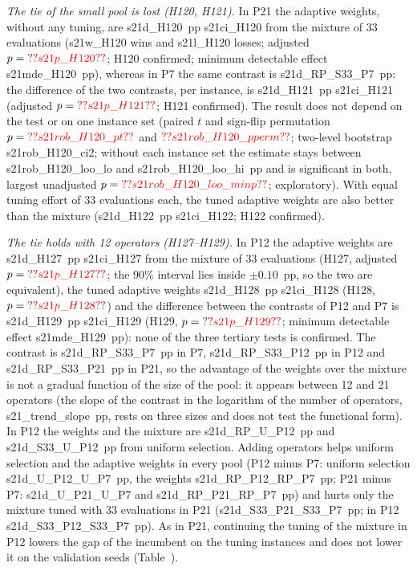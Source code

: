 \emph{The tie of the small pool is lost (H120, H121).} In P21 the adaptive weights, without any tuning, are \num{s21d_H120}~pp \num{s21ci_H120} from the mixture of 33 evaluations (\num{s21w_H120} wins and \num{s21l_H120} losses; adjusted $p=\num{s21p_H120}$; H120 confirmed; minimum detectable effect \num{s21mde_H120}~pp), whereas in P7 the same contrast is \num{s21d_RP_S33_P7}~pp: the difference of the two contrasts, per instance, is \num{s21d_H121}~pp \num{s21ci_H121} (adjusted $p=\num{s21p_H121}$; H121 confirmed). The result does not depend on the test or on one instance set (paired $t$ and sign-flip permutation $p=\num{s21rob_H120_pt}$ and $\num{s21rob_H120_pperm}$; two-level bootstrap \num{s21rob_H120_ci2}; without each instance set the estimate stays between \num{s21rob_H120_loo_lo} and \num{s21rob_H120_loo_hi}~pp and is significant in both, largest unadjusted $p=\num{s21rob_H120_loo_minp}$; exploratory). With equal tuning effort of 33 evaluations each, the tuned adaptive weights are also better than the mixture (\num{s21d_H122}~pp \num{s21ci_H122}; H122 confirmed).

\emph{The tie holds with 12 operators (H127--H129).} In P12 the adaptive weights are \num{s21d_H127}~pp \num{s21ci_H127} from the mixture of 33 evaluations (H127, adjusted $p=\num{s21p_H127}$; the 90\% interval lies inside $\pm0.10$~pp, so the two are equivalent), the tuned adaptive weights \num{s21d_H128}~pp \num{s21ci_H128} (H128, $p=\num{s21p_H128}$) and the difference between the contrasts of P12 and P7 is \num{s21d_H129}~pp \num{s21ci_H129} (H129, $p=\num{s21p_H129}$; minimum detectable effect \num{s21mde_H129}~pp): none of the three tertiary tests is confirmed. The contrast is \num{s21d_RP_S33_P7}~pp in P7, \num{s21d_RP_S33_P12}~pp in P12 and \num{s21d_RP_S33_P21}~pp in P21, so the advantage of the weights over the mixture is not a gradual function of the size of the pool: it appears between 12 and 21 operators (the slope of the contrast in the logarithm of the number of operators, \num{s21_trend_slope}~pp, rests on three sizes and does not test the functional form). In P12 the weights and the mixture are \num{s21d_RP_U_P12}~pp and \num{s21d_S33_U_P12}~pp from uniform selection. Adding operators helps uniform selection and the adaptive weights in every pool (P12 minus P7: uniform selection \num{s21d_U_P12_U_P7}~pp, the weights \num{s21d_RP_P12_RP_P7}~pp; P21 minus P7: \num{s21d_U_P21_U_P7} and \num{s21d_RP_P21_RP_P7}~pp) and hurts only the mixture tuned with 33 evaluations in P21 (\num{s21d_S33_P21_S33_P7}~pp; in P12 \num{s21d_S33_P12_S33_P7}~pp). As in P21, continuing the tuning of the mixture in P12 lowers the gap of the incumbent on the tuning instances and does not lower it on the validation seeds (Table~).

